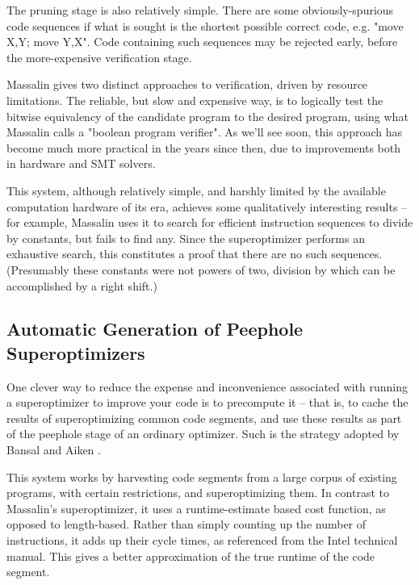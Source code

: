\documentclass[12pt,twoside]{reedthesis}
\begin{document}
            The pruning stage is also relatively simple.
            There are some obviously-spurious code sequences if what is sought is the shortest possible correct code, e.g. "move X,Y; move Y,X".
            Code containing such sequences may be rejected early, before the more-expensive verification stage.
                
            Massalin gives two distinct approaches to verification, driven by resource limitations.
            The reliable, but slow and expensive way, is to logically test the bitwise equivalency of the candidate program to the desired program, using what Massalin calls a "boolean program verifier".
            As we'll see soon, this approach has become much more practical in the years since then, due to improvements both in hardware and SMT solvers. 
                
            This system, although relatively simple, and harshly limited by the available computation hardware of its era, achieves some qualitatively interesting results -- for example, Massalin uses it to search for efficient instruction sequences to divide by constants, but fails to find any.
            Since the superoptimizer performs an exhaustive search, this constitutes a proof that there are no such sequences. (Presumably these constants were not powers of two, division by which can be accomplished by a right shift.)

        \subsection{Automatic Generation of Peephole Superoptimizers}
            One clever way to reduce the expense and inconvenience associated with running a superoptimizer to improve your code is to precompute it
            -- that is, to cache the results of superoptimizing common code segments, and use these results as part of the peephole stage of an ordinary optimizer.
            Such is the strategy adopted by Bansal and Aiken \cite{bansal2006peephole}.
            
            This system works by harvesting code segments from a large corpus of existing programs, with certain restrictions, and superoptimizing them. 
            In contrast to Massalin's superoptimizer, it uses a runtime-estimate based cost function, as opposed to length-based.
            Rather than simply counting up the number of instructions, it adds up their cycle times, as referenced from the Intel technical manual.
            This gives a better approximation of the true runtime of the code segment.
            
\end{document}

